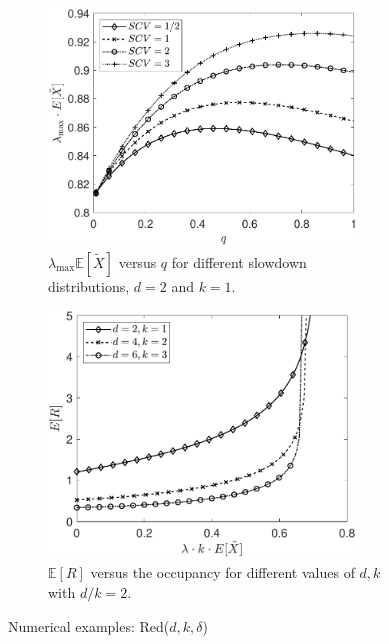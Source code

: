 \documentclass[12pt]{report}
\newcommand{\E}{\mathbb{E}}
\begin{document}
\begin{figure}[t]
	\begin{subfigure}{.44\textwidth}
		\begin{center}
			\includegraphics[width=0.9\textwidth]{figures/Chapter4/plot_ifo_q_Reddk_diffSCV.pdf}
			\caption{$\lambda_{\max} \E[\tilde{X}]$ versus $q$ for different slowdown distributions, $d=2$ and $k=1$.}
			\label{fig:reddk1}
		\end{center}
	\end{subfigure}
	\begin{subfigure}{.44\textwidth}
		\begin{center}
			\includegraphics[width=0.9\textwidth]{figures/Chapter4/plot_ifo_lam_Reddk_diffdandk.pdf}
			\caption{$\E[R]$ versus the occupancy for different values of $d,k$ with $d/k=2$.}
			\label{fig:reddk2}
		\end{center}
	\end{subfigure}
	\caption{Numerical examples: Red($d,k,\delta$)}
\end{figure} 
\end{document}
